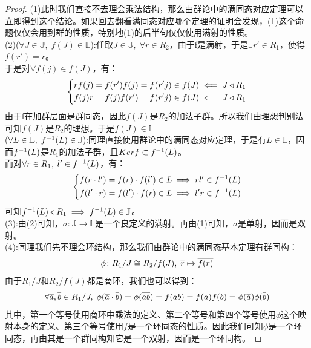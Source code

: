 \begin{proof}
(1)此时我们直接不去理会乘法结构，那么由群论中的满同态对应定理可以立即得到这个结论。如果回去翻看满同态对应哪个定理的证明会发现，(1)这个命题仅仅会用到群的性质，特别地(1)的后半句仅仅使用满射的性质。\\
(2)($\forall J\in \mathbb{J},\; f(J)\in \mathbb{L}$):任取$J\in \mathbb{J},\; \forall r\in R_2$，由于f是满射，于是$\exists r'\in R_1$，使得$f(r')=r$。\\
于是对$\forall f(j)\in f(J)$，有：
\[
\left\{
\begin{aligned}
&rf(j)=f(r')f(j)=f(r'j)\in f(J)\impliedby J\triangleleft R_1\\
&f(j)r=f(j)f(r')=f(r'j)\in f(J)\impliedby J\triangleleft R_1
\end{aligned}
\right.
\]
由于f在加群层面是群同态，因此$f(J)$是$R_2$的加法子群。所以我们由理想判别法可知$f(J)$是$R_2$的理想。于是$f(J)\in \mathbb{L}$\\
($\forall L\in \mathbb{L},\; {f}^{-1}(L)\in \mathbb{J}$):同理直接使用群论中的满同态对应定理，于是有$L\in \mathbb{L}$，因而${f}^{-1}(L)$是$R_1$的加法子群，且$Kerf\subset {f}^{-1}(L)$。\\
而对$\forall r\in R_1,\; l'\in {f}^{-1}(L)$，有：
\[
\left\{
\begin{aligned}
&f(r\cdot l')=f(r)\cdot f(l')\in L\implies rl'\in{f}^{-1}(L)\\
&f(l'\cdot r)=f(l')\cdot f(r)\in L\implies l'r\in{f}^{-1}(L)
\end{aligned}\right.
\]
可知${f}^{-1}(L)\triangleleft R_1\implies {f}^{-1}(L)\in \mathbb{J}$。\\
(3):由(2)可知，$\sigma\colon \mathbb{J}\to \mathbb{L}$是一个良定义的满射。再由(1)可知，$\sigma$是单射，因而是双射。\\
(4):同理我们先不理会环结构，那么我们由群论中的满同态基本定理有群同构：
\[
\phi\colon R_1/J\cong R_2/f(J),\; \overline{r}\mapsto \overline{f(r)}
\]
由于$R_1/J$和$R_2/f(J)$都是商环，我们也可以得到：
\[
\forall \overline{a},\overline{b}\in R_1/J,\; \phi(\overline{a}\cdot\overline{b})=\phi(\overline{ab})=f(ab)=f(a)f(b)=\phi(\overline{a})\phi(\overline{b})
\]
\indent 其中，第一个等号使用商环中乘法的定义、第二个等号和第四个等号使用$\phi$这个映射本身的定义、第三个等号使用$f$是一个环同态的性质。因此我们可知$\phi$是一个环同态，再由其是一个群同构知它是一个双射，因而是一个环同构。
\end{proof}





